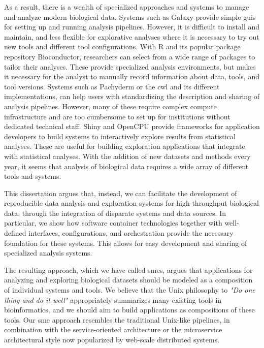 As a result, there is a wealth of specialized approaches and systems to manage
and analyze modern biological data. Systems such as Galaxy\cite{galaxy} provide
simple \glspl{gui} for setting up and running analysis pipelines. However, it is
difficult to install and maintain, and less flexible for explorative analyses
where it is necessary to try out new tools and different tool
configurations.\cite{spjuth2015experiences} With R and its popular package
repository Bioconductor\cite{bioconductor}, researchers can select from a wide
range of packages to tailor their analyses. These provide specialized analysis
environments, but makes it necessary for the analyst to manually record
information about data, tools, and tool versions. Systems such as
Pachyderm\cite{pachyderm} or the \gls{cwl}\cite{commonwl} and its different
implementations, can help users with standardizing the description and sharing
of analysis pipelines.  However, many of these require complex compute
infrastructure and are too cumbersome to set up for institutions without
dedicated technical staff. Shiny\cite{shiny} and OpenCPU\cite{opencpu} provide
frameworks for application developers to build systems to interactively explore
results from statistical analyses.  These are useful for building exploration
applications that integrate with statistical analyses.  With the addition of new
datasets and methods every year, it seems that analysis of biological data
requires a wide array of different tools and systems.

This dissertation argues that, instead, we can facilitate the development of
reproducible data analysis and exploration systems for high-throughput
biological data, through the integration of disparate systems and data sources.
In particular, we show how software container technologies together with
well-defined interfaces, configurations, and orchestration provide the necessary
foundation for these systems. This allows for easy development and sharing of
specialized analysis systems.


The resulting approach, which we have called \glspl{sme}, argues that
applications for analyzing and exploring biological datasets should be modeled
as a composition of individual systems and tools. We believe that the Unix
philosophy to \emph{"Do one thing and do it well"}\cite{raymond2003art}
appropriately summarizes many existing tools in bioinformatics, and we should
aim to build applications as compositions of these tools. Our \gls{sme} approach
resembles the traditional Unix-like pipelines, in combination with the
service-oriented architecture\cite{erl2005service} or the microservice
architectural style now popularized by web-scale distributed
systems.\cite{nadareishvili2016microservice}


